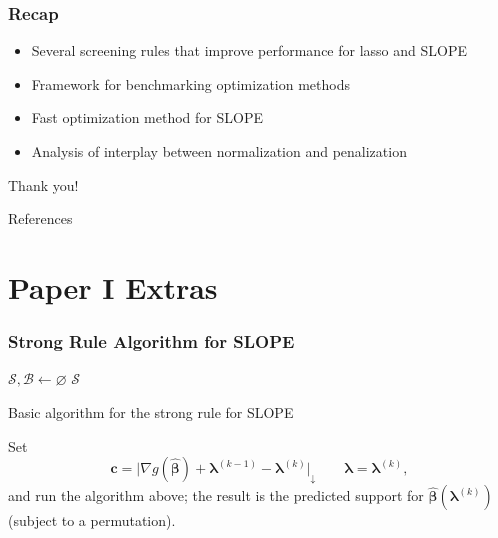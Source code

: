 \documentclass[10pt]{beamer}
\begin{document}
\begin{frame}[c]
  \frametitle{Recap}

  \begin{itemize}[<+->]
    \item Several screening rules that improve performance for lasso and SLOPE
    \item Framework for benchmarking optimization methods
    \item Fast optimization method for SLOPE
    \item Analysis of interplay between normalization and penalization
  \end{itemize}

\end{frame}

\begin{frame}[standout]
  Thank you!
\end{frame}

\appendix

\begin{frame}[allowframebreaks]{References}
  \printbibliography[heading=none]
\end{frame}

\section{Paper I Extras}

\begin{frame}[fragile]
  \frametitle{Strong Rule Algorithm for SLOPE}
  \begin{algorithm}[H]
    \SetAlgoLined
    \(\mathcal{S}, \mathcal{B} \gets \varnothing\)\;
    \Return \(\mathcal{S}\)\;
    \caption{Basic algorithm for the strong rule for SLOPE}
  \end{algorithm}
  \medskip\pause
  Set
  \[
    \bm{c} = \lvert \nabla g(\hat{\bm{\beta}})+ \bm{\lambda}^{(k-1)} - \bm{\lambda}^{(k)}\rvert_\downarrow \qquad \bm{\lambda} = \bm{\lambda}^{(k)},
  \] and run the algorithm above; the result is the predicted support for
  \(\hat{\bm{\beta}}(\bm{\lambda}^{(k)})\) (subject to a permutation).
\end{frame}
\end{document}
